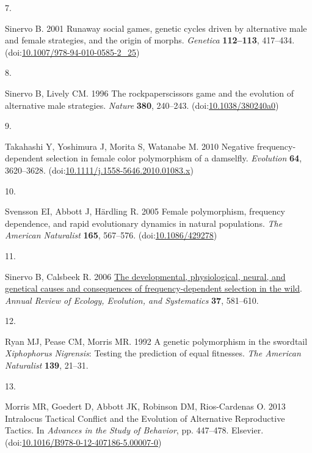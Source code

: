 \documentclass[
  11pt,
  a4paper,
]{article}
\newlength{\cslhangindent}
\newlength{\csllabelwidth}
\newlength{\cslentryspacingunit} %
\newenvironment{CSLReferences}[2] %
 {%
  \setlength{\parindent}{0pt}
  \ifodd #1
  \let\oldpar\par
  \def\par{\hangindent=\cslhangindent\oldpar}
  \fi
  \setlength{\parskip}{#2\cslentryspacingunit}
 }%
 {}
\newcommand{\CSLLeftMargin}[1]{\parbox[t]{\csllabelwidth}{#1}}
\newcommand{\CSLRightInline}[1]{\parbox[t]{\linewidth - \csllabelwidth}{#1}\break}
\begin{document}
\begin{CSLReferences}{0}{0}
\leavevmode{}%
\CSLLeftMargin{7. }%
\CSLRightInline{Sinervo B. 2001 Runaway social games, genetic cycles driven by alternative male and female strategies, and the origin of morphs. \emph{Genetica} \textbf{112--113}, 417--434. (doi:\href{https://doi.org/10.1007/978-94-010-0585-2_25}{10.1007/978-94-010-0585-2\_25})}

\leavevmode{}%
\CSLLeftMargin{8. }%
\CSLRightInline{Sinervo B, Lively CM. 1996 The rock\textendash paper\textendash scissors game and the evolution of alternative male strategies. \emph{Nature} \textbf{380}, 240--243. (doi:\href{https://doi.org/10.1038/380240a0}{10.1038/380240a0})}

\leavevmode{}%
\CSLLeftMargin{9. }%
\CSLRightInline{Takahashi Y, Yoshimura J, Morita S, Watanabe M. 2010 Negative frequency-dependent selection in female color polymorphism of a damselfly. \emph{Evolution} \textbf{64}, 3620--3628. (doi:\href{https://doi.org/10.1111/j.1558-5646.2010.01083.x}{10.1111/j.1558-5646.2010.01083.x})}

\leavevmode{}%
\CSLLeftMargin{10. }%
\CSLRightInline{Svensson EI, Abbott J, Härdling R. 2005 Female polymorphism, frequency dependence, and rapid evolutionary dynamics in natural populations. \emph{The American Naturalist} \textbf{165}, 567--576. (doi:\href{https://doi.org/10.1086/429278}{10.1086/429278})}

\leavevmode{}%
\CSLLeftMargin{11. }%
\CSLRightInline{Sinervo B, Calsbeek R. 2006 \href{https://www.jstor.org/stable/30033844}{The developmental, physiological, neural, and genetical causes and consequences of frequency-dependent selection in the wild}. \emph{Annual Review of Ecology, Evolution, and Systematics} \textbf{37}, 581--610.}

\leavevmode{}%
\CSLLeftMargin{12. }%
\CSLRightInline{Ryan MJ, Pease CM, Morris MR. 1992 A genetic polymorphism in the swordtail {\emph{Xiphophorus}}{ \emph{Nigrensis}}: Testing the prediction of equal fitnesses. \emph{The American Naturalist} \textbf{139}, 21--31.}

\leavevmode{}%
\CSLLeftMargin{13. }%
\CSLRightInline{Morris MR, Goedert D, Abbott JK, Robinson DM, Rios-Cardenas O. 2013 Intralocus {Tactical Conflict} and the {Evolution} of {Alternative Reproductive Tactics}. In \emph{Advances in the {Study} of {Behavior}}, pp. 447--478. {Elsevier}. (doi:\href{https://doi.org/10.1016/B978-0-12-407186-5.00007-0}{10.1016/B978-0-12-407186-5.00007-0})}


\end{CSLReferences}
\end{document}
